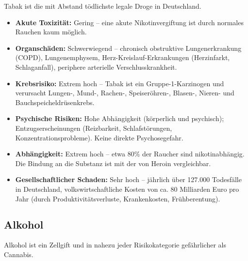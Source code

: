 \documentclass[11pt,a4paper]{article}
\begin{document}
	Tabak ist die mit Abstand tödlichste legale Droge in Deutschland. \cite{dhs-tabak}
	
	\begin{itemize}[leftmargin=*, noitemsep]
		\item \textbf{Akute Toxizität:} Gering – eine akute Nikotinvergiftung ist durch normales Rauchen kaum möglich.
		\item \textbf{Organschäden:} Schwerwiegend – chronisch obstruktive Lungenerkrankung (COPD), Lungenemphysem, Herz-Kreislauf-Erkrankungen (Herzinfarkt, Schlaganfall), periphere arterielle Verschlusskrankheit.
		\item \textbf{Krebsrisiko:} Extrem hoch – Tabak ist ein Gruppe-1-Karzinogen und verursacht Lungen-, Mund-, Rachen-, Speiseröhren-, Blasen-, Nieren- und Bauchspeicheldrüsenkrebs.
		\item \textbf{Psychische Risiken:} Hohe Abhängigkeit (körperlich und psychisch); Entzugserscheinungen (Reizbarkeit, Schlafstörungen, Konzentrationsprobleme). Keine direkte Psychosegefahr.
		\item \textbf{Abhängigkeit:} Extrem hoch – etwa 80\% der Raucher sind nikotinabhängig. Die Bindung an die Substanz ist mit der von Heroin vergleichbar.
		\item \textbf{Gesellschaftlicher Schaden:} Sehr hoch – jährlich über 127.000 Todesfälle in Deutschland, volkswirtschaftliche Kosten von ca. 80 Milliarden Euro pro Jahr (durch Produktivitätsverluste, Krankenkosten, Frühberentung).
	\end{itemize}
	
	\subsection{Alkohol}
	
	Alkohol ist ein Zellgift und in nahezu jeder Risikokategorie gefährlicher als Cannabis. \cite{who-carcinogen}
	
\end{document}

